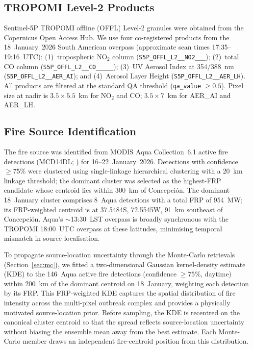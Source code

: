 \documentclass[draft]{agujournal2019}
\newcommand{\NOtwo}{NO$_2$}
\begin{document}
\subsection{TROPOMI Level-2 Products}
\label{sec:tropomi}

Sentinel-5P TROPOMI offline (OFFL) Level-2 granules were obtained from the Copernicus Open Access Hub. We use four co-registered products from the 18~January~2026 South American overpass (approximate scan times 17:35--19:16~UTC): (1)~tropospheric \NOtwo{} column (\texttt{S5P\_OFFL\_L2\_\_NO2\_\_\_}); (2)~total CO column (\texttt{S5P\_OFFL\_L2\_\_CO\_\_\_\_\_}); (3)~UV Aerosol Index at 354/388~nm (\texttt{S5P\_OFFL\_L2\_\_AER\_AI}); and (4)~Aerosol Layer Height (\texttt{S5P\_OFFL\_L2\_\_AER\_LH}). All products are filtered at the standard QA threshold (\texttt{qa\_value} $\geq 0.5$). Pixel size at nadir is $3.5 \times 5.5$~km for \NOtwo{} and CO; $3.5 \times 7$~km for AER\_AI and AER\_LH.

\subsection{Fire Source Identification}
\label{sec:fire}

The fire source was identified from MODIS Aqua Collection~6.1 active fire detections (MCD14DL; \citealt{Giglio2016}) for 16--22~January~2026. Detections with confidence $\geq 75\%$ were clustered using single-linkage hierarchical clustering with a 20~km linkage threshold; the dominant cluster was selected as the highest-FRP candidate whose centroid lies within 300~km of Concepci\'on. The dominant 18~January cluster comprises 8~Aqua detections with a total FRP of 954~MW; its FRP-weighted centroid is at 37.5484\degree{}S, 72.5545\degree{}W, 91~km southeast of Concepci\'on. Aqua's $\sim$13:30~LST overpass is broadly synchronous with the TROPOMI 18:00~UTC overpass at these latitudes, minimising temporal mismatch in source localisation.

To propagate source-location uncertainty through the Monte-Carlo retrievals (Section~\ref{sec:mc}), we fitted a two-dimensional Gaussian kernel-density estimate (KDE) to the 146~Aqua active fire detections (confidence $\geq 75\%$, daytime) within 200~km of the dominant centroid on 18~January, weighting each detection by its FRP. This FRP-weighted KDE captures the spatial distribution of fire intensity across the multi-pixel outbreak complex and provides a physically motivated source-location prior. Before sampling, the KDE is recentred on the canonical cluster centroid so that the spread reflects source-location uncertainty without biasing the ensemble mean away from the best estimate. Each Monte-Carlo member draws an independent fire-centroid position from this distribution.
\end{document}
